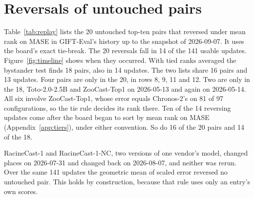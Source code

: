 \documentclass{article}
\begin{document}
\section{Reversals of untouched pairs}
\label{app:replay}

Table~\ref{tab:replay} lists the 20 untouched top-ten pairs that reversed under mean rank on
MASE in GIFT-Eval's history up to the snapshot of 2026-09-07. It uses the board's exact
tie-break. The 20 reversals fall in 14 of the 141 usable updates. Figure~\ref{fig:timeline} shows when they occurred. With tied ranks averaged the
bystander test finds 18 pairs, also in 14 updates. The two lists share 16 pairs and 13
updates. Four pairs are only in the 20, in rows 8, 9, 11 and 12. Two are only in the 18,
Toto-2.0-2.5B and ZooCast-Top1 on 2026-05-13 and again on 2026-05-14. All six involve
ZooCast-Top1, whose error equals Chronos-2's on 81 of 97 configurations, so the tie rule
decides its rank there. Ten of the 14 reversing updates come after the board began to sort by
mean rank on MASE (Appendix~\ref{app:tiers}), under either convention. So do 16 of the 20 pairs
and 14 of the 18.

RacineCast-1 and RacineCast-1-NC, two versions of one vendor's model, changed places on
2026-07-31 and changed back on 2026-08-07, and neither was rerun. Over the same 141 updates the
geometric mean of scaled error reversed no untouched pair. This holds by construction, because
that rule uses only an entry's own scores.
\end{document}

